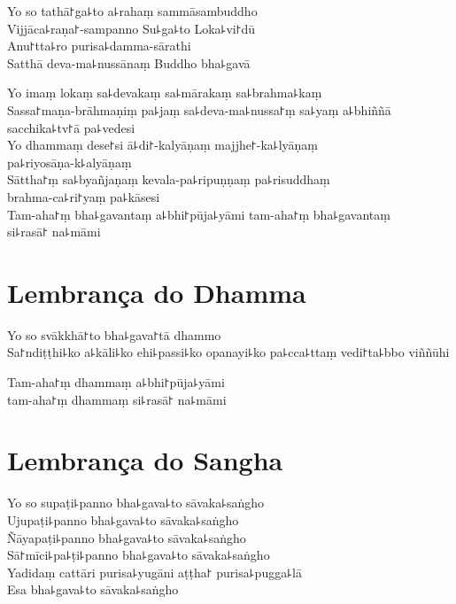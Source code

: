 Yo so tathā꜓ga꜕to a꜕rahaṃ sammāsambuddho\\
Vijjāca꜕raṇa꜓-sampanno Su꜕ga꜕to Loka꜕vi꜓dū\\
Anu꜓tta꜕ro purisa꜕damma-sārathi\\
Satthā deva-ma꜕nussānaṃ Buddho bha꜕gavā

Yo imaṃ lokaṃ sa꜕devakaṃ sa꜕mārakaṃ sa꜕brahma꜕kaṃ\\
Sassa꜓maṇa-brāhmaṇiṃ pa꜕jaṃ sa꜕deva-ma꜕nussa꜓ṃ sa꜕yaṃ a꜕bhiññā sacchika꜕tv꜓ā pa꜕vedesi\\
Yo dhammaṃ dese꜓si ā꜕di꜓-kalyāṇaṃ majjhe꜓-ka꜕lyāṇaṃ\\
pa꜕riyosāṇa-k꜕alyāṇaṃ\\
Sāttha꜓ṃ sa꜕byañjaṇaṃ kevala-pa꜕ripuṇṇaṃ pa꜕risuddhaṃ\\
brahma-ca꜕ri꜓yaṃ pa꜕kāsesi\\

Tam-aha꜓ṃ bha꜕gavantaṃ a꜕bhi꜓pūja꜕yāmi tam-aha꜓ṃ bha꜕gavantaṃ\\
si꜕rasā꜓ na꜕māmi 

\chapter{Lembrança do Dhamma}     %

\begin{leader}
\end{leader}

Yo so svākkhā꜓to bha꜕gava꜓tā dhammo\\
Sa꜓ndiṭṭhi꜕ko a꜕kāli꜕ko ehi꜕passi꜕ko opanayi꜕ko pa꜕cca꜕ttaṃ vedi꜓ta꜕bbo viññūhi

Tam-aha꜓ṃ dhammaṃ a꜕bhi꜓pūja꜕yāmi\\
\vin tam-aha꜓ṃ dhammaṃ si꜕rasā꜓ na꜕māmi 

\enlargethispage{\baselineskip}
\clearpage

\chapter{Lembrança do Sangha}     %

\begin{leader}
\end{leader}

Yo so supaṭi꜕panno bha꜕gava꜕to sāvaka꜕saṅgho\\
Ujupaṭi꜕panno bha꜕gava꜕to sāvaka꜕saṅgho\\
Ñāyapaṭi꜕panno bha꜕gava꜕to sāvaka꜕saṅgho\\
Sā꜓mīci꜕pa꜕ṭi꜕panno bha꜕gava꜕to sāvaka꜕saṅgho\\
Yadidaṃ cattāri purisa꜕yugāni aṭṭha꜓ purisa꜕pugga꜕lā\\
Esa bha꜕gava꜕to sāvaka꜕saṅgho

